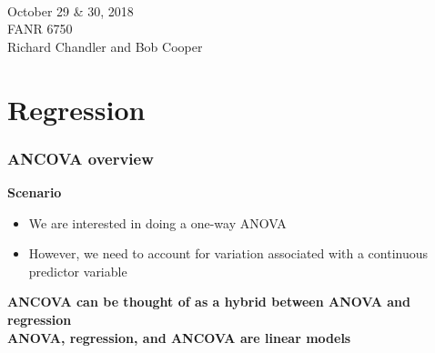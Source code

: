 \documentclass[color=usenames,dvipsnames]{beamer}\usepackage[]{graphicx}\usepackage[]{color}
\begin{document}



\begin{frame}[plain]
  \huge
  \centering \par
  {\color{RoyalBlue}{Lab 11 -- ANCOVA}} \\
  \vspace{1cm}
  \Large
  October 29 \& 30, 2018 \\
  FANR 6750 \\
  \vfill
  \large
  Richard Chandler and Bob Cooper

\end{frame}



\section{Regression}




\begin{frame}
  \frametitle{ANCOVA overview}
  {\bf Scenario}
  \begin{itemize}
    \item We are interested in doing a one-way ANOVA
    \item However, we need to account for variation associated with a
      continuous predictor variable
  \end{itemize}
  \pause
  \vfill
  \bf
  ANCOVA can be thought of as a hybrid between ANOVA and regression \\
  \pause
  \vfill
  \bf
  ANOVA, regression, and ANCOVA are linear models \\
\end{frame}
\end{document}
